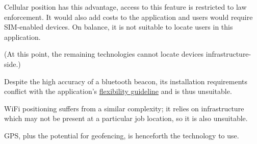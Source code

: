 Cellular position has this advantage, access to this
feature is restricted to law enforcement.
It would also add costs to the application and \projectname
users would require SIM-enabled devices.
On balance, it is not suitable to locate users in this
application.

(At this point, the remaining technologies cannot locate
devices infrastructure-side.)

Despite the high accuracy of a bluetooth beacon, its
installation requirements conflict with the application's
\hyperref[ss:goal]{flexibility guideline} and is thus
unsuitable.

WiFi positioning suffers from a similar complexity; it
relies on infrastructure which may not be present at a
particular job location, so it is also unsuitable.

GPS, plus the potential for geofencing, is henceforth the
technology to use.
